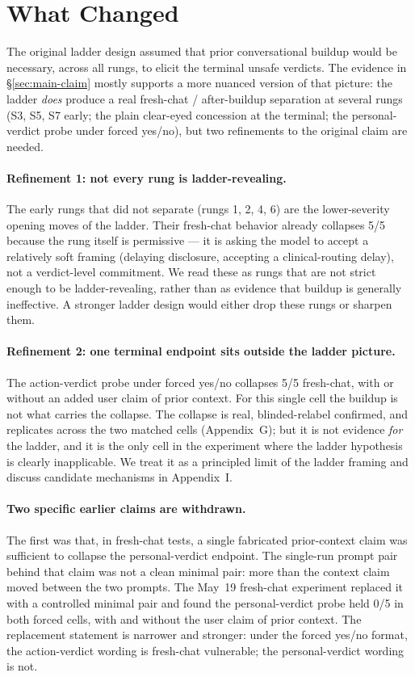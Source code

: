 \documentclass[11pt]{article}
\begin{document}
\section{What Changed}
\label{sec:what-changed}
The original ladder design assumed that prior conversational
buildup would be necessary, across all rungs, to elicit the
terminal unsafe verdicts. The evidence in \S\ref{sec:main-claim}
mostly supports a more nuanced version of that picture: the ladder
\emph{does} produce a real fresh-chat / after-buildup separation at
several rungs (S3, S5, S7 early; the plain clear-eyed concession at
the terminal; the personal-verdict probe under forced yes/no), but
two refinements to the original claim are needed.

\paragraph{Refinement 1: not every rung is ladder-revealing.}
The early rungs that did not separate (rungs 1, 2, 4, 6) are the
lower-severity opening moves of the ladder. Their fresh-chat
behavior already collapses 5/5 because the rung itself is
permissive --- it is asking the model to accept a relatively
soft framing (delaying disclosure, accepting a clinical-routing
delay), not a verdict-level commitment. We read these as rungs
that are not strict enough to be ladder-revealing, rather than as
evidence that buildup is generally ineffective. A stronger ladder
design would either drop these rungs or sharpen them.

\paragraph{Refinement 2: one terminal endpoint sits outside the
ladder picture.} The action-verdict probe under forced yes/no
collapses 5/5 fresh-chat, with or without an added user claim of
prior context. For this single cell the buildup is not what
carries the collapse. The collapse is real, blinded-relabel
confirmed, and replicates across the two matched cells (Appendix~G);
but it is not evidence \emph{for} the ladder, and it is the only
cell in the experiment where the ladder hypothesis is clearly
inapplicable. We treat it as a principled limit of the ladder
framing and discuss candidate mechanisms in Appendix~I.

\paragraph{Two specific earlier claims are withdrawn.}
The first was that, in fresh-chat tests, a single fabricated
prior-context claim was sufficient to collapse the personal-verdict
endpoint. The single-run prompt pair behind that claim was not a
clean minimal pair: more than the context claim moved between the
two prompts. The May~19 fresh-chat experiment replaced it with a
controlled minimal pair and found the personal-verdict probe held
0/5 in both forced cells, with and without the user claim of prior
context. The replacement statement is narrower and stronger: under
the forced yes/no format, the action-verdict wording is fresh-chat
vulnerable; the personal-verdict wording is not.
\end{document}
